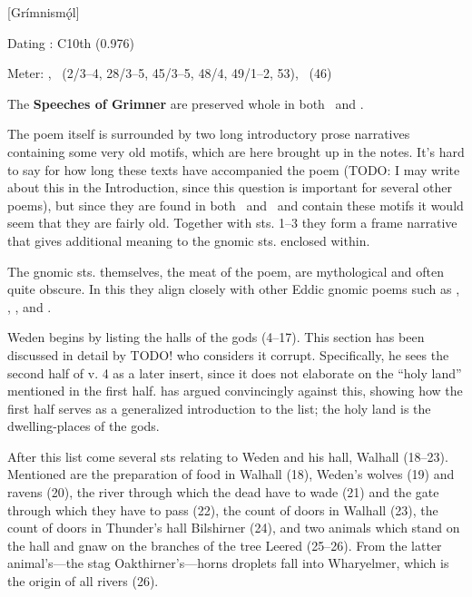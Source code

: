 [Grímnismǫ́l]

\begin{flushright}%
Dating \parencite{Sapp2022}: C10th (0.976)

Meter: \Ljodahattr, \Fornyrdislag\ (2/3–4, 28/3–5, 45/3–5, 48/4, 49/1–2, 53), \Galdralag\ (46)%
\end{flushright}


The \textbf{Speeches of Grimner} are preserved whole in both \Regius\ and \AM.

The poem itself is surrounded by two long introductory prose narratives containing some very old motifs, which are here brought up in the notes. It’s hard to say for how long these texts have accompanied the poem (TODO: I may write about this in the Introduction, since this question is important for several other poems), but since they are found in both \Regius\ and \AM\ and contain these motifs it would seem that they are fairly old. Together with sts. 1–3 they form a frame narrative that gives additional meaning to the gnomic sts. enclosed within.

The gnomic sts. themselves, the meat of the poem, are mythological and often quite obscure. In this they align closely with other Eddic gnomic poems such as \Havamal, \Vafthrudnismal, \Sigrdrifumal, and \Allvismal.

Weden begins by listing the halls of the gods (4–17). This section has been discussed in detail by \textcite{deVries1952} TODO! who considers it corrupt. Specifically, he sees the second half of v. 4 as a later insert, since it does not elaborate on the “holy land” mentioned in the first half. \textcite{Jackson1995} has argued convincingly against this, showing how the first half serves as a generalized introduction to the list; the holy land is the dwelling-places of the gods.

After this list come several sts relating to Weden and his hall, Walhall (18–23). Mentioned are the preparation of food in Walhall (18), Weden’s wolves (19) and ravens (20), the river through which the dead have to wade (21) and the gate through which they have to pass (22), the count of doors in Walhall (23), the count of doors in Thunder’s hall Bilshirner (24), and two animals which stand on the hall and gnaw on the branches of the tree Leered (25–26). From the latter animal’s—the stag Oakthirner’s—horns droplets fall into Wharyelmer, which is the origin of all rivers (26).


